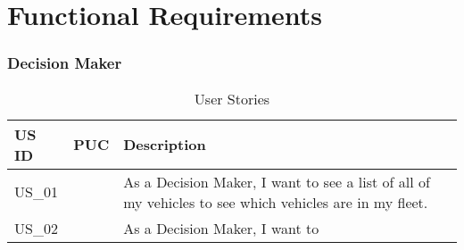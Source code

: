 \chapter{Functional Requirements}
\begin{table}[h]
    \caption{User Stories}
    \subsection*{Decision Maker}
    \label{FunctionalRequirements}
    \renewcommand{\arraystretch}{1.2}
    \centering
    \sffamily
    \begin{footnotesize}
      \begin{tabular}{l l L}
      \toprule
      \textbf{US ID} & \textbf{PUC} & \textbf{Description}\\
      \midrule
      US\_01 & & As a Decision Maker, I want to see a list of all of my vehicles to see which vehicles are in my fleet.\\
      US\_02 & & As a Decision Maker, I want to 
      \bottomrule
      \end{tabular}
    \end{footnotesize}
    \rmfamily
  \end{table}